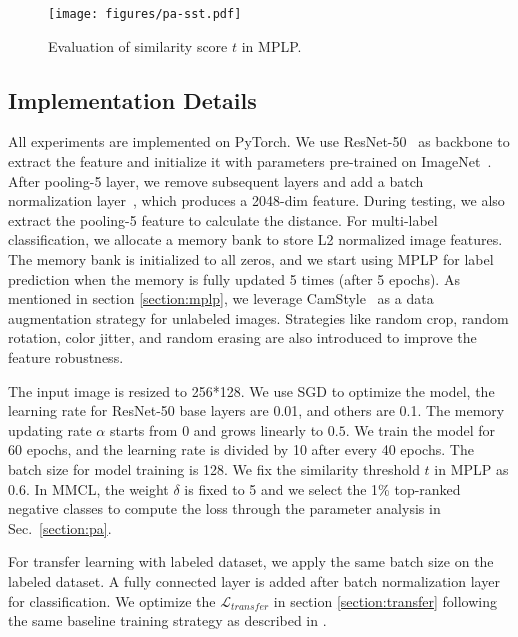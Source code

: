 \documentclass[10pt,twocolumn,letterpaper]{article}
\begin{document}
\begin{figure}
\begin{center}
\texttt{[image: figures/pa-sst.pdf]}
\end{center}
\vspace{-2mm}
\caption{Evaluation of similarity score $t$ in MPLP.}
\vspace{-2mm}
\label{figure:pa-sst}
\end{figure}

\vspace{-1mm}
\subsection{Implementation Details}\label{sec:implement}
\vspace{-1mm}
All experiments are implemented on PyTorch. We use ResNet-50~\cite{he2016deep} as backbone to extract the feature and initialize it with parameters pre-trained on ImageNet~\cite{5206848}. After pooling-5 layer, we remove subsequent layers and add a batch normalization layer~\cite{ioffe2015batch}, which produces a 2048-dim feature. During testing, we also extract the pooling-5 feature to calculate the distance. For multi-label classification, we allocate a memory bank to store L2 normalized image features. The memory bank is initialized to all zeros, and we start using MPLP for label prediction when the memory is fully updated 5 times (after 5 epochs). As mentioned in section \ref{section:mplp}, we leverage CamStyle~\cite{zhong2018camera} as a data augmentation strategy for unlabeled images. Strategies like random crop, random rotation, color jitter, and random erasing are also introduced to improve the feature robustness.

The input image is resized to 256*128. We use SGD to optimize the model, the learning rate for ResNet-50 base layers are 0.01, and others are 0.1. The memory updating rate $\alpha$ starts from $0$ and grows linearly to $0.5$. We train the model for 60 epochs, and the learning rate is divided by 10 after every 40 epochs. The batch size for model training is 128. We fix the similarity threshold $t$ in MPLP as 0.6. In MMCL, the weight $\delta$ is fixed to 5 and we select the 1\% top-ranked negative classes to compute the loss through the parameter analysis in Sec.~\ref{section:pa}.

For transfer learning with labeled dataset, we apply the same batch size on the labeled dataset. A fully connected layer is added after batch normalization layer for classification. We optimize the $\mathcal {L}_{transfer}$ in section \ref{section:transfer} following the same baseline training strategy as described in \cite{Fu_2019_ICCV}.
\end{document}
